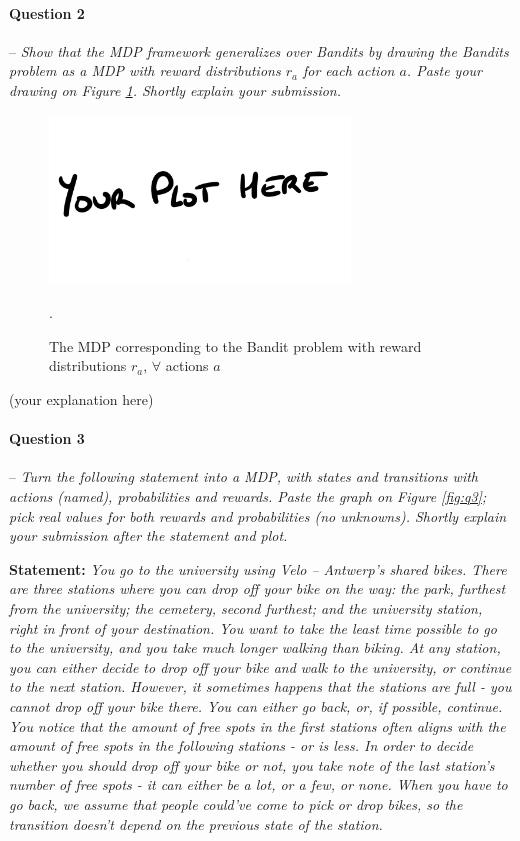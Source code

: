 \documentclass[a4paper]{article}
\newcommand{\question}[2]{
\paragraph{Question #1} -- \textit{#2}

}
\begin{document}
		\question{2}{Show that the MDP framework generalizes over Bandits by drawing the Bandits problem as a MDP with reward distributions $r_a$ for each action $a$. 
				Paste your drawing on Figure \ref{fig:bandit_mdp}. 
				Shortly explain your submission.}

			\begin{figure}[H]
				\centering
				\includegraphics[width=8cm]{plots/your_plot_here.png}
				\caption{The MDP corresponding to the Bandit problem with reward distributions $r_a$, $\forall$ actions $a$}.
				\label{fig:bandit_mdp}
			\end{figure}{}
			(your explanation here)


		\question{3}{Turn the following statement into a MDP, with states and transitions with actions (named), probabilities and rewards. 
				Paste the graph on Figure \ref{fig:q3}; pick real values for both rewards and probabilities (no unknowns). 
				Shortly explain your submission after the statement and plot.}

			\textbf{Statement:}  \emph{You go to the university using Velo -- Antwerp's shared bikes. 
				There are three stations where you can drop off your bike on the way: the park, furthest from the university; the cemetery, second furthest; and the university station, right in front of your destination.
				You want to take the least time possible to go to the university, and you take much longer walking than biking.
				At any station, you can either decide to drop off your bike and walk to the university, or continue to the next station.
				However, it sometimes happens that the stations are full - you cannot drop off your bike there. You can either go back, or, if possible, continue.
				You notice that the amount of free spots in the first stations often aligns with the amount of free spots in the following stations - or is less. 
				In order to decide whether you should drop off your bike or not, you take note of the last station's number of free spots - it can either be a lot, or a few, or none.
				When you have to go back, we assume that people could've come to pick or drop bikes, so the transition doesn't depend on the previous state of the station.}
\end{document}
